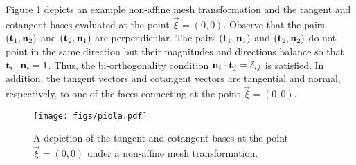 \documentclass[../doc.tex]{subfiles}
\begin{document}
Figure \ref{fem:piola_diag} depicts an example non-affine mesh transformation and the tangent and cotangent bases evaluated at the point $\vec{\xi} = (0,0)$. Observe that the pairs $(\boldsymbol{\mathrm{t}}_1, \boldsymbol{\mathrm{n}}_2)$ and $(\boldsymbol{\mathrm{t}}_2, \boldsymbol{\mathrm{n}}_1)$ are perpendicular. The pairs $(\boldsymbol{\mathrm{t}}_1, \boldsymbol{\mathrm{n}}_1)$ and $(\boldsymbol{\mathrm{t}}_2, \boldsymbol{\mathrm{n}}_2)$ do not point in the same direction but their magnitudes and directions balance so that $\boldsymbol{\mathrm{t}}_i\cdot \boldsymbol{\mathrm{n}}_i = 1$. Thus, the bi-orthogonality condition $\boldsymbol{\mathrm{n}}_i\cdot\boldsymbol{\mathrm{t}}_j = \delta_{ij}$ is satisfied. In addition, the tangent vectors and cotangent vectors are tangential and normal, respectively, to one of the faces connecting at the point $\vec{\xi} = (0,0)$. 
\begin{figure}
	\centering
	\texttt{[image: figs/piola.pdf]}
	\caption{A depiction of the tangent and cotangent bases at the point $\vec{\xi} = (0,0)$ under a non-affine mesh transformation. }
	\label{fem:piola_diag}
\end{figure}
\end{document}
